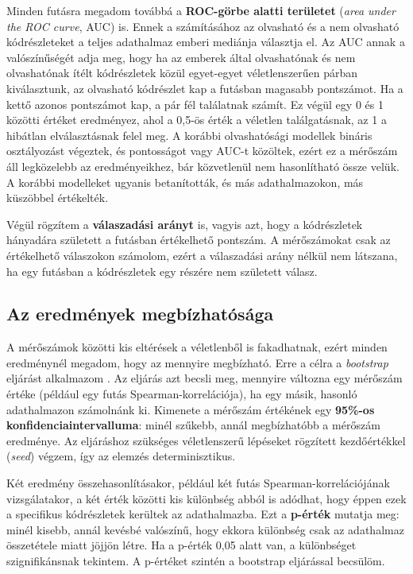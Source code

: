 \documentclass[
]{elteikthesis}[2024/04/26]
\begin{document}
Minden futásra megadom továbbá a \textbf{ROC-görbe alatti területet}
(\textit{area under the ROC curve}, AUC) is. Ennek a számításához az olvasható
és a nem olvasható kódrészleteket a teljes adathalmaz emberi mediánja választja
el. Az AUC annak a valószínűségét adja meg, hogy ha az emberek által
olvashatónak és nem olvashatónak ítélt kódrészletek közül egyet-egyet
véletlenszerűen párban kiválasztunk, az olvasható kódrészlet kap a futásban
magasabb pontszámot. Ha a kettő azonos pontszámot kap, a pár fél találatnak
számít. Ez végül egy 0 és 1 közötti értéket eredményez, ahol a 0,5-ös érték a
véletlen találgatásnak, az 1 a hibátlan elválasztásnak felel meg. A korábbi
olvashatósági modellek bináris osztályozást végeztek, és pontosságot vagy AUC-t
közöltek, ezért ez a mérőszám áll legközelebb az eredményeikhez, bár közvetlenül
nem hasonlítható össze velük. A korábbi modelleket ugyanis betanították, és más
adathalmazokon, más küszöbbel értékelték.

Végül rögzítem a \textbf{válaszadási arányt} is, vagyis azt, hogy a kódrészletek
hányadára született a futásban értékelhető pontszám. A mérőszámokat csak az
értékelhető válaszokon számolom, ezért a válaszadási arány nélkül nem látszana,
ha egy futásban a kódrészletek egy részére nem született válasz.

\subsection{Az eredmények megbízhatósága}

A mérőszámok közötti kis eltérések a véletlenből is fakadhatnak, ezért minden
eredménynél megadom, hogy az mennyire megbízható. Erre a célra a
\textit{bootstrap} eljárást alkalmazom \cite{efron1979bootstrap}. Az eljárás azt
becsli meg, mennyire változna egy mérőszám értéke (például egy futás
Spearman-korrelációja), ha egy másik, hasonló adathalmazon számolnánk ki.
Kimenete a mérőszám értékének egy \textbf{95\%-os konfidenciaintervalluma}:
minél szűkebb, annál megbízhatóbb a mérőszám eredménye. Az eljáráshoz szükséges
véletlenszerű lépéseket rögzített kezdőértékkel (\textit{seed}) végzem, így az
elemzés determinisztikus.

Két eredmény összehasonlításakor, például két futás Spearman-korrelációjának
vizsgálatakor, a két érték közötti kis különbség abból is adódhat, hogy éppen
ezek a specifikus kódrészletek kerültek az adathalmazba. Ezt a \textbf{p-érték}
mutatja meg: minél kisebb, annál kevésbé valószínű, hogy ekkora különbség csak
az adathalmaz összetétele miatt jöjjön létre. Ha a p-érték 0,05 alatt van, a
különbséget szignifikánsnak tekintem. %
A p-értéket szintén a bootstrap eljárással becsülöm.
\end{document}
